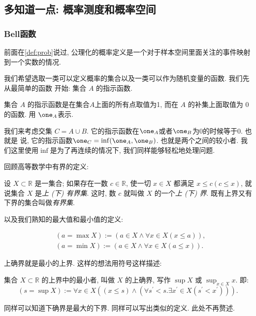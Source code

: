 
\subsection*{多知道一点: 概率测度和概率空间}

\subsubsection*{Bell函数}

前面在\cref{def:prob}说过, 公理化的概率定义是一个对于样本空间里面关注的事件映射到一个实数的情况. 

我们希望选取一类可以定义概率的集合以及一类可以作为随机变量的函数. 我们先从最简单的函数
开始: 集合 $A$ 的指示函数.

\begin{definition*}
    集合 $A$ 的指示函数是在集合$A$上面的所有点取值为1, 而在 $A$ 的补集上面取值为
    0的函数. 用 $\one_A$表示.
\end{definition*}

我们来考虑交集 $C=A\cup B$. 它的指示函数在$\one_A$或者$\one_B$为0的时候等于0. 也就是
说, 它的指示函数$\one_C=\inf(\one_A, \one_B)$. 也就是两个之间的较小者. 我们这里使用$\inf$是为了再连续的情况下, 我们同样能够轻松地处理问题. 

\begin{asidebox}
    回顾高等数学中有界的定义: 
    \begin{definition*}
        设 $X \subset \mathbb{R}$ 是一集合; 如果存在一数 $c \in \mathbb{R}$, 使一切 $x \in X$ 都满足 $x \leq c(c \leq x)$, 就说集合 $X$ 是\emph{上 (下) 有界集}.
    这时, 数 $c$ 就叫做 $X$ 的一个\emph{上 (下) 界}.
    既有上界又有下界的集合叫做\emph{有界集}.
    \end{definition*}


    以及我们熟知的最大值和最小值的定义: 
    \begin{definition*}
        $$\begin{aligned} & (a=\max X):=(a \in X \wedge \forall x \in X(x \leq a)), \\ & (a=\min X):=(a \in X \wedge \forall x \in X(a \leq x)) .\end{aligned}$$
    \end{definition*}

    上确界就是最小的上界. 这样的想法用符号这样描述: 
    \begin{definition*}
         集合 $X \subset \mathbb{R}$ 的上界中的最小者, 叫做 $X$ 的上确界, 写作 $\sup X$ 或 $\sup _{x \in X} x$. 即: $$(s=\sup X):=\forall x \in X\left((x \leq s) \wedge\left(\forall s^{\prime}<s. \exists x^{\prime} \in X\left(s^{\prime}<x^{\prime}\right)\right)\right).$$
    \end{definition*}

    同样可以知道下确界是最大的下界. 同样可以写出类似的定义. 此处不再赘述.
\end{asidebox}

